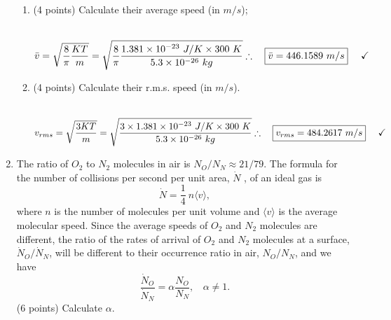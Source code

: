 \documentclass[fleqn]{article}
\begin{document}
\begin{enumerate}
\begin{enumerate}
        \item (4 points) Calculate their average speed (in $m/s$);

          \textcolor{hwColor}{
            \\
            $
              \bar{v}=\sqrt{\dfrac{8}{\pi} \dfrac{ K T }{m}}
              =\sqrt{\dfrac{8}{\pi} \dfrac{1.381 \times 10^{-23} ~ J/K \times 300 ~ K}{5.3 \times 10^{-26} ~ kg}}
              \\
              \\
              \\
              \therefore ~~~ \boxed{
                \bar{v}=  446.1589 ~ m/s
              } ~~~~ \checkmark
              \\
              \\
            $
          }

        \item (4 points) Calculate their r.m.s. speed (in $m/s$).

          \textcolor{hwColor}{
            \\
            $
              v_{rms}=\sqrt{\dfrac{3 K T }{m}}
              =\sqrt{\dfrac{3 \times 1.381 \times 10^{-23} ~ J/K \times 300 ~ K}{5.3 \times 10^{-26} ~ kg}}
              \\
              \\
              \\
              \therefore ~~~ \boxed{
                v_{rms}=484.2617 ~ m/s
              } ~~~~ \checkmark
              \\
              \\
            $
          }

      \end{enumerate}

    \pagebreak

    \item The ratio of $O_2$ to $N_2$ molecules in air is $N_O/ N_N \approx 21/79.$
    The formula for the number of collisions per second per unit area, $\dot{N}$ , of an ideal gas is
    $$
      \dot{N}=\dfrac{1}{4} ~ n \langle v \rangle,
    $$
    where $n$ is the number of molecules per unit volume and $\langle v \rangle$ is the average molecular speed.
    Since the average speeds of $O_2$ and $N_2$ molecules are different, the ratio of the rates of arrival
    of $O_2$ and $N_2$ molecules at a surface, $\dot{N}_O/\dot{N}_N$, will be different to their occurrence ratio in air,
    $N_O/ N_N$, and we have
    $$
      \dfrac{\dot{N}_O}{\dot{N}_N}=\alpha \dfrac{N_O}{N_N}, ~~~~ \alpha \neq 1.
    $$
    (6 points) Calculate $\alpha$.


\end{enumerate}
\end{document}
